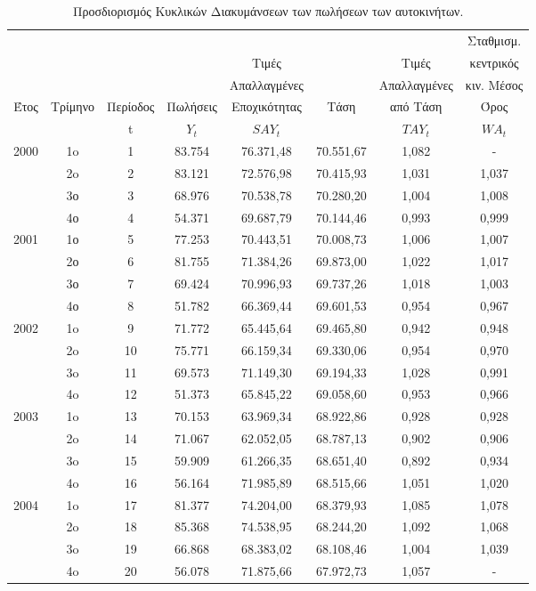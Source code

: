 \begin{table} [h]
  \caption{Προσδιορισμός Κυκλικών Διακυμάνσεων των πωλήσεων των αυτοκινήτων.} 
  \label{tab_4}
  \begin{center}
    \begin{tabular}{|c|c|c|c|c|c|c|c|}
      \hline
           &   &   &   &
           &   &  &Σταθμισμ.      \\
           &   &   &
           & Τιμές   &     &Τιμές    & κεντρικός   \\
          &   &   & 
           &Απαλλαγμένες  &  &Απαλλαγμένες  &κιν. Μέσος  \\
          Έτος  &Τρίμηνο  & Περίοδος & Πωλήσεις
            &Εποχικότητας  & Τάση  & από Τάση   &Όρος  \\
        &  & t  &$ Y_t$  &$ SAY_t$  &  & $ TAY_t$ & $ WA_t$ \\
      \hline \hline
      2000 &  1o  &  1  &  83.754  &  76.371,48  &  70.551,67  & 1,082  &  -\\
           &  2o  &  2  &  83.121  &  72.576,98  &  70.415,93  & 1,031  &  1,037\\
           & 3ο & 3  &  68.976 & 70.538,78  & 70.280,20  & 1,004 & 1,008 \\
           & 4ο & 4 & 54.371 & 69.687,79 & 70.144,46  & 0,993 & 0,999 \\
           
        2001   & 1ο & 5  & 77.253  & 70.443,51  &  70.008,73 & 1,006 &  1,007\\
        & 2ο & 6 & 81.755 & 71.384,26 & 69.873,00  & 1,022 & 1,017\\
        & 3ο & 7  &69.424  & 70.996,93 & 69.737,26 & 1,018 &1,003 \\
        & 4ο &8  & 51.782 & 66.369,44 & 69.601,53 & 0,954 & 0,967\\
     2002   & 1o & 9 & 71.772 & 65.445,64 & 69.465,80 & 0,942 & 0,948 \\
     & 2o  & 10 & 75.771 & 66.159,34 & 69.330,06 & 0,954 & 0,970\\
     & 3o & 11 & 69.573 & 71.149,30 & 69.194,33 & 1,028 & 0,991\\
     & 4o & 12 & 51.373 & 65.845,22 &  69.058,60 & 0,953 &0,966\\
   2003  & 1o & 13 &70.153  & 63.969,34 & 68.922,86 & 0,928  &0,928\\
     & 2o & 14 &71.067 & 62.052,05 & 68.787,13 & 0,902& 0,906\\
     & 3o & 15 & 59.909  & 61.266,35 &68.651,40  & 0,892 &0,934\\
      & 4o & 16 & 56.164 & 71.985,89 & 68.515,66 & 1,051 & 1,020\\
      2004& 1o &  17& 81.377 & 74.204,00 & 68.379,93 & 1,085 & 1,078\\
      & 2o & 18 & 85.368 & 74.538,95  & 68.244,20 &1,092 &1,068\\
      & 3o &19  & 66.868 & 68.383,02 & 68.108,46 & 1,004 &1,039\\
      & 4o & 20 & 56.078 & 71.875,66 & 67.972,73 & 1,057 &-\\
     

\end{tabular}
\end{center}
\end{table}
